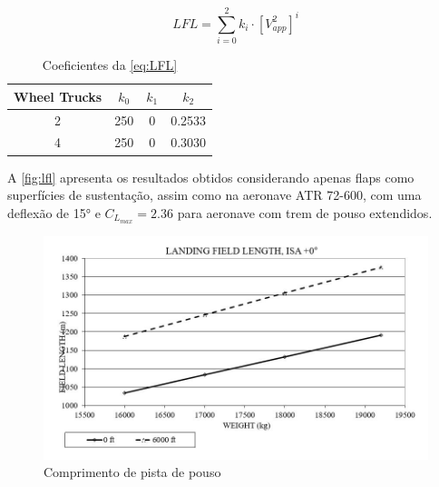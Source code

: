 \begin{equation}
\label{eq:LFL}
    LFL = \sum_{i=0}^{2} k_i \cdot \left[ V_{app}^2 \right]^i
\end{equation}


\begin{table}[H]
    \centering
    \begin{tabular}{c|c c c}
        Wheel Trucks & $k_0$ & $k_1$ & $k_2$  \\ \toprule
         2 & 250 & 0 & 0.2533 \\
         4 & 250 & 0 & 0.3030 \\ \bottomrule
    \end{tabular}
    \caption{Coeficientes da \autoref{eq:LFL}}
    \label{tab:LFL}
\end{table}

A \autoref{fig:lfl} apresenta os resultados obtidos considerando apenas flaps como superfícies de sustentação, assim como na aeronave ATR 72-600, com uma deflexão de 15° e $C_{L_{max}} = 2.36$ para aeronave com trem de pouso extendidos.

\begin{figure}[H]
\centering
\includegraphics[width=1.\textwidth]{images/parte4/LFL.JPG}
\caption{Comprimento de pista de pouso}
\label{fig:lfl}
\end{figure}
